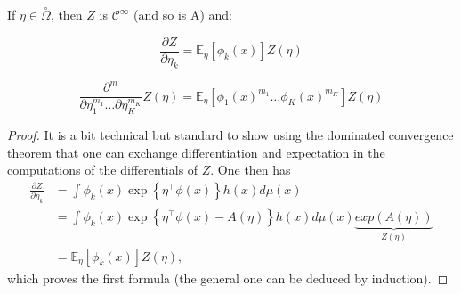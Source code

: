 \documentclass[12pt]{report}
\begin{document}
\begin{theorem}
If $\eta \in \overset{\circ}{\Omega} $, then $Z$ is ${\mathcal C}^\infty$ (and so is A) and:

$$ \frac{\partial Z}{\partial \eta_k} =  \mathbb{E}_\eta[\phi_k(x)] Z(\eta) $$

$$ \frac{\partial^m}{\partial \eta_1^{m_1} \ldots \partial \eta_K^{m_K}} Z(\eta) = \mathbb{E}_\eta[\phi_1(x)^{m_1} \ldots \phi_K(x)^{m_K}] Z(\eta) $$

\end{theorem}

\begin{proof}
It is a bit technical but standard to show using the dominated convergence theorem that one can exchange differentiation and expectation in the computations of the differentials of $Z$. One then has
$$
\begin{aligned}
\frac{\partial Z}{\partial \eta_k} & = \int \phi_k(x) \exp \left\lbrace \eta^\top \phi(x) \right\rbrace h(x) d\mu(x)\\
& = \int \phi_k(x) \exp \left\lbrace \eta^\top \phi(x) - A(\eta) \right\rbrace h(x) d\mu(x) \underbrace{exp(A(\eta))}_{Z(\eta)}\\
& = \mathbb{E}_\eta[\phi_k(x)] Z(\eta),
\end{aligned}
$$
which proves the first formula (the general one can be deduced by induction).
\end{proof}
\end{document}
